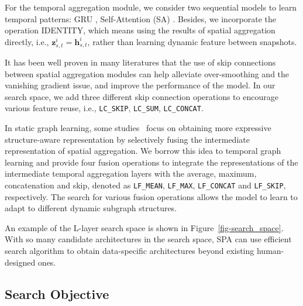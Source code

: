 \documentclass[11pt]{article}
\begin{document}
 For the temporal aggregation module, 
we consider two sequential models to learn temporal patterns: GRU \citep{cho-etal-2014-learning} , Self-Attention (SA) \citep{vaswani2017attention}. 
Besides, 
we incorporate the operation IDENTITY, 
which means using the results of spatial aggregation directly, 
i.e., $\mathbf{z}_{s,t}^i=\mathbf{h}_{s,t}^i$, 
rather than learning dynamic feature between snapshots. 

 It has been well proven in many literatures \citep{li2021deepgcns} that the use of skip connections between spatial aggregation modules can help alleviate over-smoothing and the vanishing gradient issue, 
and improve the performance of the model. 
In our search space, 
we add three different skip connection operations to encourage various feature reuse, 
i.e., \texttt{LC\_SKIP}, \texttt{LC\_SUM}, \texttt{LC\_CONCAT}. 

 In static graph learning, 
some studies~\citep{xu2018representation} 
focus on obtaining more expressive structure-aware representation 
by selectively fusing the intermediate representation of spatial aggregation. 
We borrow this idea to temporal graph learning and 
provide four fusion operations 
to integrate the representations of the intermediate temporal aggregation layers with 
the average, 
maximum, 
concatenation 
and skip, 
denoted as \texttt{LF\_MEAN}, \texttt{LF\_MAX}, \texttt{LF\_CONCAT} and \texttt{LF\_SKIP}, 
respectively. 
The search for various fusion operations 
allows the model to learn to adapt to different dynamic subgraph structures. 
 
An example of the L-layer search space is shown in Figure~\ref{fig-search_space}.
With so many candidate architectures in the search space, 
SPA can use efficient search algorithm 
to obtain data-specific architectures 
beyond existing human-designed ones.

\subsection{Search Objective}
\end{document}
